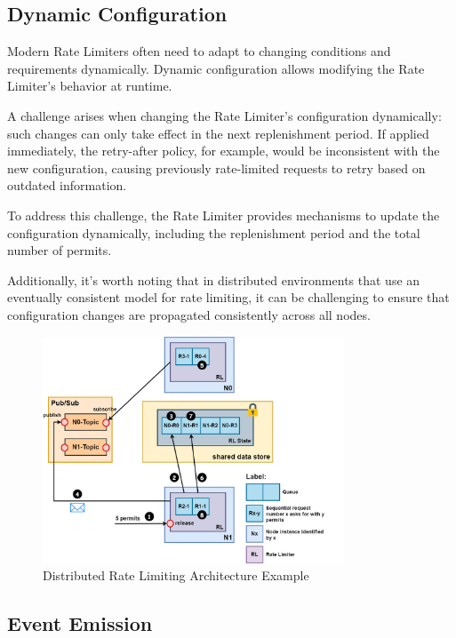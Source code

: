 \subsection{Dynamic Configuration}\label{subsec:rate-limiter-dynamic-configuration}

Modern Rate Limiters often need to adapt to changing conditions and requirements dynamically.
Dynamic configuration allows modifying the Rate Limiter's behavior at runtime.

A challenge arises when changing the Rate Limiter's configuration dynamically: such changes can only take effect in
the next replenishment period.
If applied immediately, the retry-after policy, for example, would be inconsistent with the new configuration,
causing previously rate-limited requests to retry based on outdated information.

To address this challenge, the Rate Limiter provides mechanisms to update the configuration dynamically, including the
replenishment period and the total number of permits.

Additionally, it's worth noting that in distributed environments that use an eventually consistent model for rate limiting,
it can be challenging to ensure that configuration changes are propagated consistently across all nodes.

\begin{figure}[!htb]
    \centering
    \includegraphics[width=0.8\textwidth]{../figures/06_distributed-rate-limiting-architecture}
    \caption{Distributed Rate Limiting Architecture Example}
    \label{fig:distributed-rate-limiting-architecture}
\end{figure}

\subsection{Event Emission}\label{subsec:rate-limiter-event-emission}

